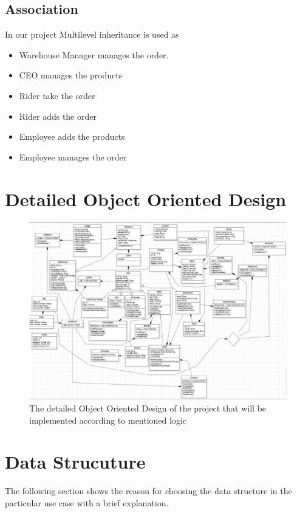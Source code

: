 \documentclass[12pt,a4paper]{article}
\begin{document}
\subsection{Association}
In our project Multilevel inheritance is used as
\begin{itemize}
\item Warehouse Manager manages the order.
\item CEO manages the products
\item Rider take the order 
\item Rider adds the order
\item Employee adds the products
\item Employee manages the order 
\end{itemize}

\section{Detailed Object Oriented Design}
\begin{figure}
  \centering
    \includegraphics[scale=0.8]{Image.jpg}
  \caption{The detailed Object Oriented Design of the project that will be implemented according to mentioned logic}
\end{figure}
\newpage
\section{Data Strucuture}
The following section shows the reason for choosing the data structure in the particular use case with a brief explanation.
\end{document}
